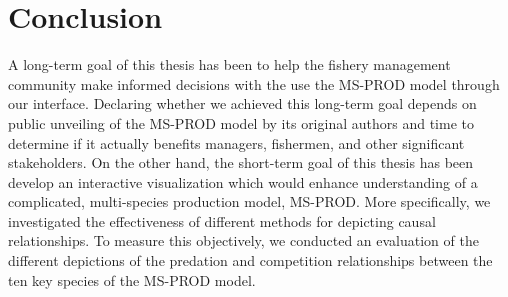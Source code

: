 \chapter{Conclusion}

A long-term goal of this thesis has been to help the fishery management community make informed decisions with the use the MS-PROD model through our interface.  Declaring whether we achieved this long-term goal depends on public unveiling of the MS-PROD model by its original authors and time to determine if it actually benefits managers, fishermen, and other significant stakeholders.  On the other hand, the short-term goal of this thesis has been develop an interactive visualization which would enhance understanding of a complicated, multi-species production model, MS-PROD.  More specifically, we investigated the effectiveness of different methods for depicting causal relationships.  To measure this objectively, we conducted an evaluation of the different depictions of the predation and competition relationships between the ten key species of the MS-PROD model.
